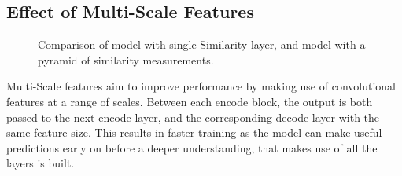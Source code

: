 \documentclass[ %
                    author={Gavin Parker},
                supervisor={Dr. Neill Campbell},
                    degree={MEng},
                     title={Deep Siamese Networks for Illumination Estimation from Stereo Images},
                  subtitle={},
                      type={research},
                      year={2018} ]{dissertation}
\begin{document}
\subsection{Effect of Multi-Scale Features}
\begin{figure}[H]
\setlength\figureheight{6cm}
\setlength\figurewidth{12cm}
\centering

\caption{Comparison of model with single Similarity layer, and model with a pyramid of similarity measurements.}
\end{figure}
Multi-Scale features aim to improve performance by making use of convolutional features at a range of scales. Between each encode block, the output is both passed to the next encode layer, and the corresponding decode layer with the same feature size. This results in faster training as the model can make useful predictions early on before a deeper understanding, that makes use of all the layers is built.
\end{document}
